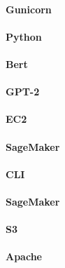 \documentclass[12pt, a4paper, titlepage]{report}
\begin{document}
			\paragraph{Gunicorn}
			\paragraph{Python}
			\paragraph{Bert}
			\paragraph{GPT-2}
			\paragraph{EC2}
			\paragraph{SageMaker}
			\paragraph{CLI}
			\paragraph{SageMaker}
			\paragraph{S3}
			\paragraph{Apache}
			
			
\end{document}
